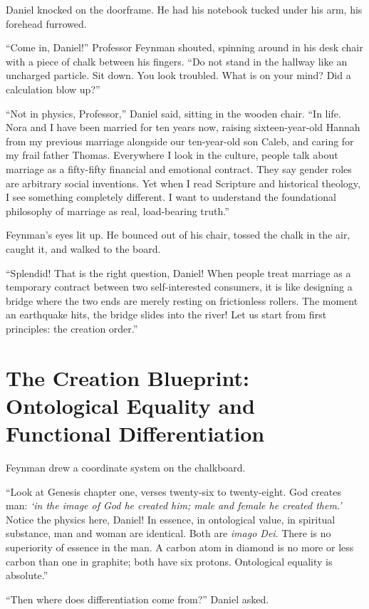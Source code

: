 \documentclass[11pt]{report}
\begin{document}
Daniel knocked on the doorframe. He had his notebook tucked under his arm, his forehead furrowed.

``Come in, Daniel!'' Professor Feynman shouted, spinning around in his desk chair with a piece of chalk between his fingers. ``Do not stand in the hallway like an uncharged particle. Sit down. You look troubled. What is on your mind? Did a calculation blow up?''

``Not in physics, Professor,'' Daniel said, sitting in the wooden chair. ``In life. Nora and I have been married for ten years now, raising sixteen-year-old Hannah from my previous marriage alongside our ten-year-old son Caleb, and caring for my frail father Thomas. Everywhere I look in the culture, people talk about marriage as a fifty-fifty financial and emotional contract. They say gender roles are arbitrary social inventions. Yet when I read Scripture and historical theology, I see something completely different. I want to understand the foundational philosophy of marriage as real, load-bearing truth.''

Feynman's eyes lit up. He bounced out of his chair, tossed the chalk in the air, caught it, and walked to the board.

``Splendid! That is the right question, Daniel! When people treat marriage as a temporary contract between two self-interested consumers, it is like designing a bridge where the two ends are merely resting on frictionless rollers. The moment an earthquake hits, the bridge slides into the river! Let us start from first principles: the creation order.''

\section{The Creation Blueprint: Ontological Equality and Functional Differentiation}
Feynman drew a coordinate system on the chalkboard.

``Look at Genesis chapter one, verses twenty-six to twenty-eight. God creates man: \textit{`in the image of God he created him; male and female he created them.'} Notice the physics here, Daniel! In essence, in ontological value, in spiritual substance, man and woman are identical. Both are \textit{imago Dei}. There is no superiority of essence in the man. A carbon atom in diamond is no more or less carbon than one in graphite; both have six protons. Ontological equality is absolute.''

``Then where does differentiation come from?'' Daniel asked.
\end{document}

